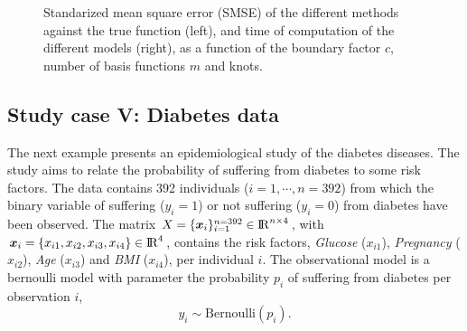 \documentclass[]{interact}
\theoremstyle{plain}%
\theoremstyle{definition}
\theoremstyle{remark}
\begin{document}
\begin{figure}
\caption{Standarized mean square error (SMSE) of the different methods against the true function (left), and time of computation of the different models (right), as a function of the boundary factor $c$, number of basis functions $m$ and knots.}
  \label{fig17_RMSE_exII}
\end{figure}


\subsection{Study case V: Diabetes data}\label{sec:bf_caseV}
The next example presents an epidemiological study of the diabetes diseases. The study aims to relate the probability of suffering from diabetes to some risk factors. The data contains 392 individuals ($i=1,\cdots,n=392$) from which the binary variable of suffering ($y_i=1$) or not suffering ($y_i=0$) from diabetes have been observed. The matrix $X=\{\bm{x}_i\}_{i=1}^{n=392} \in {\rm I\!R}^{n\times 4}$,  with $\bm{x}_i=\{x_{i1},x_{i2},x_{i3},x_{i4}\} \in {\rm I\!R}^{4}$, contains the risk factors, \textit{Glucose} ($x_{i1}$), \textit{Pregnancy} ($x_{i2}$), \textit{Age} ($x_{i3}$) and \textit{BMI} ($x_{i4}$), per individual $i$. The observational model is a bernoulli model with parameter the probability $p_i$ of suffering from diabetes per observation $i$,
%
\begin{equation*}
y_i \sim \text{Bernoulli}(p_i).
\end{equation*}
\end{document}
